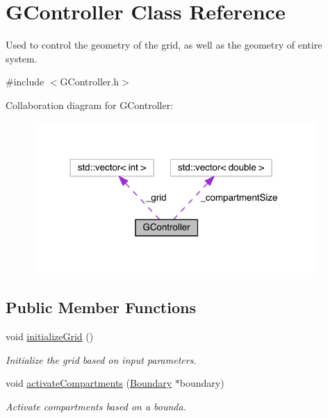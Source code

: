 \hypertarget{classGController}{\section{G\+Controller Class Reference}
\label{classGController}
}


Used to control the geometry of the grid, as well as the geometry of entire system.  




{\ttfamily \#include $<$G\+Controller.\+h$>$}



Collaboration diagram for G\+Controller\+:\nopagebreak
\begin{figure}[H]
\begin{center}
\leavevmode
\includegraphics[width=304pt]{classGController__coll__graph}
\end{center}
\end{figure}
\subsection*{Public Member Functions}
\begin{DoxyCompactItemize}
\item 
void \hyperlink{classGController_ab6320a7a310d6693855c31c0da6e975d}{initialize\+Grid} ()
\begin{DoxyCompactList}\small\item\em Initialize the grid based on input parameters. \end{DoxyCompactList}\item 
void \hyperlink{classGController_ab035cc1a9b6822a3342a049c88ac9805}{activate\+Compartments} (\hyperlink{classBoundary}{Boundary} $\ast$boundary)
\begin{DoxyCompactList}\small\item\em Activate compartments based on a bounda. \end{DoxyCompactList}\end{DoxyCompactItemize}
